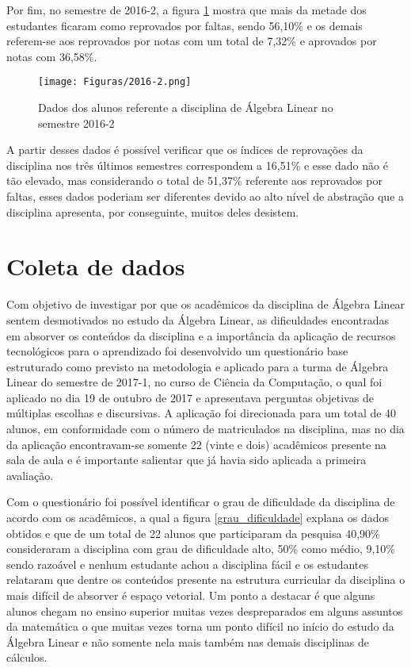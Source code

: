 Por fim, no semestre de 2016-2, a figura \ref{algebra_linear_2016_2} mostra que mais da metade dos estudantes ficaram como reprovados por faltas, sendo 56,10\% e os demais referem-se aos reprovados por notas com um total de 7,32\% e aprovados por notas com 36,58\%.

\begin{figure}[!htb]
  \centering 
  \texttt{[image: Figuras/2016-2.png]}
  \caption{Dados dos alunos referente a disciplina de Álgebra Linear no semestre 2016-2}\label{algebra_linear_2016_2}
\end{figure}

A partir desses dados é possível verificar que os índices de reprovações da disciplina nos três últimos semestres correspondem a 16,51\% e esse dado não é tão elevado, mas considerando o total de 51,37\% referente aos reprovados por faltas, esses dados poderiam ser diferentes devido ao alto nível de abstração que a disciplina apresenta, por conseguinte, muitos deles desistem.

\section{Coleta de dados}
\label{coleta_dados}

\noindent Com objetivo de investigar por que os acadêmicos da disciplina de Álgebra Linear sentem desmotivados no estudo da Álgebra Linear, as dificuldades encontradas em absorver os conteúdos da disciplina e a importância da aplicação de recursos tecnológicos para o aprendizado foi desenvolvido um questionário base estruturado como previsto na metodologia e aplicado para a turma de Álgebra Linear do semestre de 2017-1, no curso de Ciência da Computação, o qual foi aplicado no dia 19 de outubro de 2017 e apresentava perguntas objetivas de múltiplas escolhas e discursivas. A aplicação foi direcionada para um total de 40 alunos, em conformidade com o número de matriculados na disciplina, mas no dia da aplicação encontravam-se somente 22 (vinte e dois) acadêmicos presente na sala de aula e é importante salientar que já havia sido aplicada a primeira avaliação.  

Com o questionário foi possível identificar o grau de dificuldade da disciplina de acordo com os acadêmicos, a qual a figura \ref{grau_dificuldade} explana os dados obtidos e que de um total de 22 alunos que participaram da pesquisa 40,90\% consideraram a disciplina com grau de dificuldade alto, 50\% como médio, 9,10\% sendo razoável e nenhum estudante achou a disciplina fácil e os estudantes relataram que dentre os conteúdos presente na estrutura curricular da disciplina o mais difícil de absorver é espaço vetorial. Um ponto a destacar é que alguns alunos chegam no ensino superior muitas vezes despreparados em alguns assuntos da matemática o que muitas vezes torna um ponto difícil no início do estudo da Álgebra Linear e não somente nela mais também nas demais disciplinas de cálculos.

